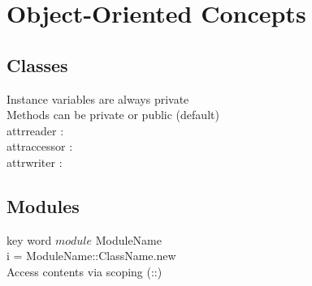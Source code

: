 \section{Object-Oriented Concepts}
\subsection*{Classes}
Instance variables are always private\\
Methods can be private or public (default)\\
attr\textunderscore reader : \\
attr\textunderscore accessor : \\
attr\textunderscore writer : \\

\subsection*{Modules}
key word $module$ ModuleName\\
i = ModuleName::ClassName.new\\
Access contents via scoping (::)\\